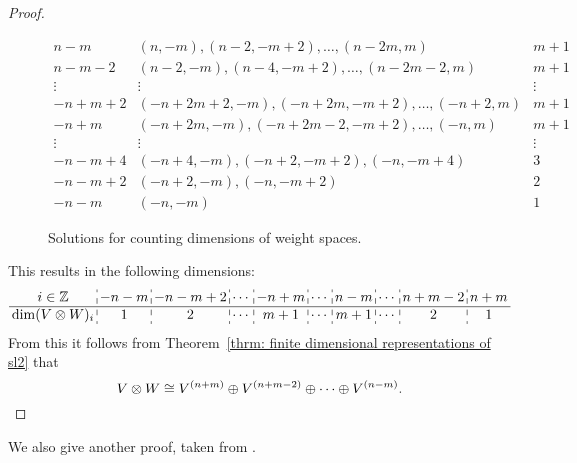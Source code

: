 \begin{proof}
\begin{figure}
\[\begin{array}{c|c|c}
  n-m    & (n, -m), (n-2, -m+2), \dotsc,  (n-2m, m)      & m+1    \\
  n-m-2  & (n-2, -m), (n-4, -m+2), \dotsc, (n-2m-2, m)   & m+1    \\
  \vdots & \vdots                                        & \vdots \\
  -n+m+2 & (-n+2m+2,-m), (-n+2m, -m+2), \dotsc, (-n+2,m) & m+1    \\
  -n+m   & (-n+2m,-m), (-n+2m-2, -m+2), \dotsc, (-n,m)   & m+1    \\
  \vdots & \vdots                                        & \vdots \\
  -n-m+4 & (-n+4,-m), (-n+2,-m+2), (-n,-m+4)             & 3      \\
  -n-m+2 & (-n+2,-m), (-n,-m+2)                          & 2      \\
  -n-m   & (-n,-m)                                       & 1
  \end{array}
 \]
 \caption{Solutions for counting dimensions of weight spaces.}
 \label{fig: solutions for counting dimensions}
 \end{figure}
 This results in the following dimensions:
 \[
  \setlength\arraycolsep{2pt}
  \begin{array}{c:c:c:c:c:c:c:c:c:c}
   i \in \Z            & -n-m & -n-m+2 & \cdots & -n+m & \cdots & n-m & \cdots & n+m-2 & n+m \\
   \hline
   \dim(V \otimes W)_i & 1    & 2      & \cdots & m+1  & \cdots & m+1 & \cdots & 2     & 1
  \end{array}
 \]
 From this it follows from Theorem~\ref{thrm: finite dimensional representations of sl2} that
 \[
  V \otimes W \cong V^{(n+m)} \oplus V^{(n+m-2)} \oplus \dotsb \oplus V^{(n-m)}.
  \qedhere
 \]
\end{proof}


We also give another proof, taken from \cite[\S 1.4]{Lectures_on_sl2_modules}.


